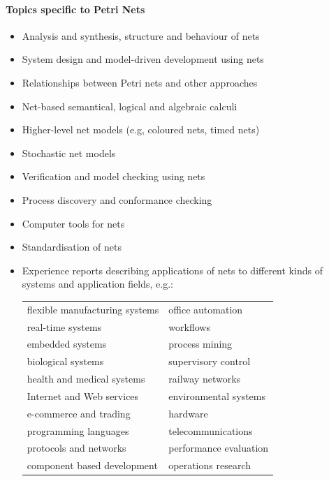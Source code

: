 \documentclass[10pt]{article}
\begin{document}
\begin{multicols}{2}
\paragraph*{Topics specific to Petri Nets}

\begin{itemize}
\item Analysis and synthesis, structure and behaviour of nets
\item System design and model-driven development using nets
\item Relationships between Petri nets and other approaches
\item Net-based semantical, logical and algebraic calculi
\item Higher-level net models (e.g, coloured nets, timed nets)
\item Stochastic net models
\item Verification and model checking using nets
\item Process discovery and conformance checking
\item Computer tools for nets
\item Standardisation of nets
\end{itemize}

\columnbreak

\begin{itemize}
\item Experience reports describing applications of nets to different kinds of systems
and application fields, e.g.:

	\begin{tabular}{ll}
	flexible manufacturing systems & office automation \\
	real-time systems & workflows \\
	embedded systems & process mining \\
	biological systems & supervisory control \\
	health and medical systems & railway networks  \\
	Internet and Web services & environmental systems \\
	e-commerce and trading & hardware \\
	programming languages & telecommunications  \\
	protocols and networks & performance evaluation \\
	component based development & operations research \\
	\end{tabular}
\end{itemize}
\end{multicols}
\end{document}
